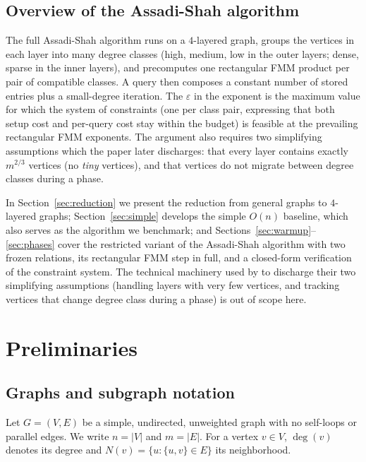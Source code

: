\documentclass[sigconf,nonacm]{acmart}
\theoremstyle{plain}
\theoremstyle{definition}
\begin{document}
\subsection{Overview of the Assadi-Shah algorithm}
\label{sec:related:positioning}
The full Assadi-Shah algorithm runs on a $4$-layered graph, groups
the vertices in each layer into many degree classes (high, medium,
low in the outer layers; dense, sparse in the inner layers), and
precomputes one rectangular FMM product per pair of compatible
classes. A query then composes a constant number of stored entries
plus a small-degree iteration. The $\varepsilon$ in the exponent is
the maximum value for which the system of constraints (one per
class pair, expressing that both setup cost and per-query cost stay
within the budget) is feasible at the prevailing rectangular
FMM exponents. The argument also requires two simplifying
assumptions which the paper later discharges: that every layer
contains exactly $m^{2/3}$ vertices (no \emph{tiny} vertices), and
that vertices do not migrate between degree classes during a
phase.

In Section~\ref{sec:reduction} we present the reduction from
general graphs to $4$-layered graphs;
Section~\ref{sec:simple} develops the simple $O(n)$ baseline,
which also serves as the algorithm we benchmark; and
Sections~\ref{sec:warmup}--\ref{sec:phases} cover the restricted
variant of the Assadi-Shah algorithm with two frozen relations,
its rectangular FMM step in full, and a closed-form verification
of the constraint system. The technical machinery used by
\cite{AssadiShah25} to discharge their two simplifying
assumptions (handling layers with very few vertices, and tracking
vertices that change degree class during a phase) is out of scope
here.

\section{Preliminaries}
\label{sec:prelim}

\subsection{Graphs and subgraph notation}
\label{sec:prelim:notation}
Let $G = (V, E)$ be a simple, undirected, unweighted graph with no
self-loops or parallel edges. We write $n = |V|$ and $m = |E|$.
For a vertex $v \in V$, $\deg(v)$ denotes its degree and
$N(v) = \{u : \{u,v\} \in E\}$ its neighborhood.
\end{document}
